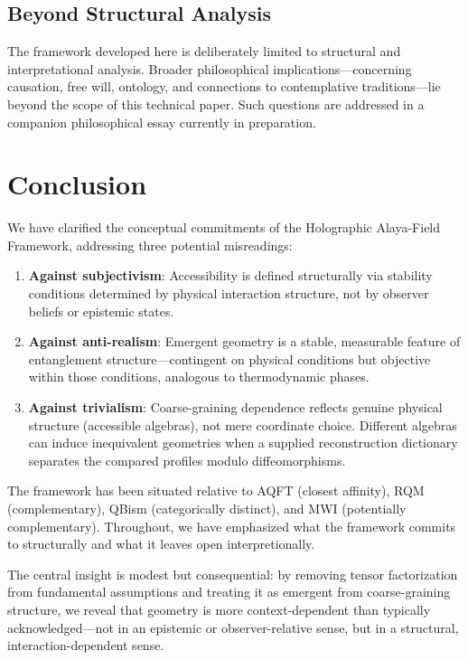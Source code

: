 \documentclass[12pt,a4paper]{article}
\begin{document}
\subsection{Beyond Structural Analysis}

The framework developed here is deliberately limited to structural and interpretational analysis. Broader philosophical implications—concerning causation, free will, ontology, and connections to contemplative traditions—lie beyond the scope of this technical paper. Such questions are addressed in a companion philosophical essay currently in preparation.

\section{Conclusion}

We have clarified the conceptual commitments of the Holographic Alaya-Field Framework, addressing three potential misreadings:

\begin{enumerate}
\item \textbf{Against subjectivism}: Accessibility is defined structurally via stability conditions determined by physical interaction structure, not by observer beliefs or epistemic states.

\item \textbf{Against anti-realism}: Emergent geometry is a stable, measurable feature of entanglement structure—contingent on physical conditions but objective within those conditions, analogous to thermodynamic phases.

\item \textbf{Against trivialism}: Coarse-graining dependence reflects genuine physical structure (accessible algebras), not mere coordinate choice. Different algebras can induce inequivalent geometries when a supplied reconstruction dictionary separates the compared profiles modulo diffeomorphisms.
\end{enumerate}

The framework has been situated relative to AQFT (closest affinity), RQM (complementary), QBism (categorically distinct), and MWI (potentially complementary). Throughout, we have emphasized what the framework commits to structurally and what it leaves open interpretionally.

The central insight is modest but consequential: by removing tensor factorization from fundamental assumptions and treating it as emergent from coarse-graining structure, we reveal that geometry is more context-dependent than typically acknowledged—not in an epistemic or observer-relative sense, but in a structural, interaction-dependent sense.
\end{document}
